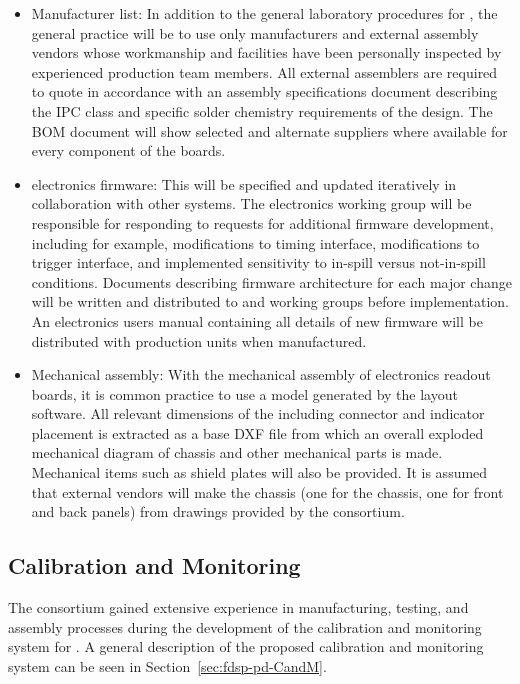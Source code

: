 \begin{itemize}
\item Manufacturer list: In addition to the general laboratory procedures for , the general practice will be to use only  manufacturers and external assembly vendors whose workmanship and facilities have been personally inspected by experienced production team members. All external assemblers are required to quote in accordance with an assembly specifications document describing the IPC class and specific solder chemistry requirements of the design. The BOM document will show selected and alternate suppliers where available for every component of the  boards.

\item {} electronics firmware: This will be specified and updated iteratively in collaboration with other systems. The electronics working group will be responsible for responding to requests for additional firmware development, including for example, modifications to timing interface, modifications to trigger interface, and implemented sensitivity to in-spill versus not-in-spill conditions. Documents describing firmware architecture for each major change will be written and distributed to  and  working groups before implementation. An   electronics users manual containing all details of new firmware will be distributed with production units when manufactured.

\item Mechanical assembly: With the mechanical assembly of electronics readout boards, it is common practice to use a \threed model generated by the layout software.   
All relevant dimensions of the  including connector and indicator placement is extracted as a base DXF file from which an overall exploded mechanical diagram of chassis and other mechanical parts is made.  Mechanical items such as shield plates will also be provided. It is assumed that external vendors will make the  chassis %
(one for the chassis, one for front and back panels) from drawings provided by the consortium.

\end{itemize}

\subsection{Calibration and Monitoring}
\label{sec:fdsp-pd-assy-CandM}

The consortium gained extensive experience in manufacturing, testing, and assembly processes 
during the development of the calibration and monitoring system for .
A general description of the proposed calibration and monitoring system can be seen in  Section~\ref{sec:fdsp-pd-CandM}. 

